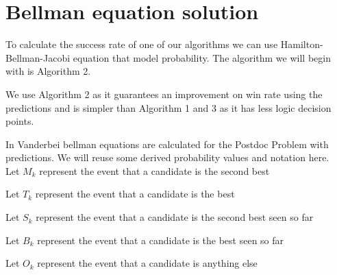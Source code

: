 \documentclass[a4paper,11pt]{article}
\begin{document}



\section{Bellman equation solution}

To calculate the success rate of one of our algorithms we can use Hamilton-Bellman-Jacobi equation that model probability. The algorithm we will begin with is Algorithm 2. \cite{Dreyfus_2002}

We use Algorithm 2 as it guarantees an improvement on win rate using the predictions and is simpler than Algorithm 1 and 3 as it has less logic decision points.

In Vanderbei \cite{vanderbei2011postdoc} bellman equations are calculated for the Postdoc Problem with predictions. We will reuse some derived probability values and notation here.\\

Let $M_k$ represent the event that a candidate is the second best

Let $T_k$ represent the event that a candidate is the best

Let $S_k$ represent the event that a candidate is the second best seen so far

Let $B_k$ represent the event that a candidate is the best seen so far

Let $O_k$ represent the event that a candidate is anything else
\end{document}
